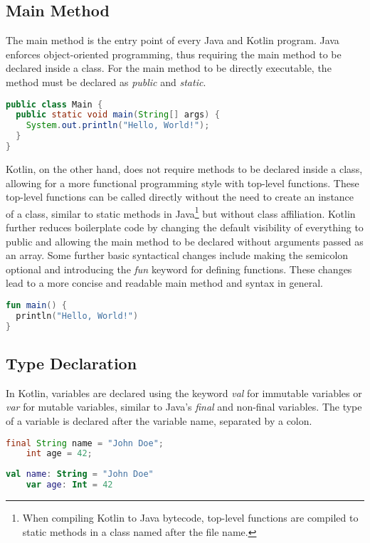 \documentclass[a4paper, 11pt]{article}
\begin{document}
\subsection{Main Method}
  The main method is the entry point of every Java and Kotlin program.
  Java enforces object-oriented programming, thus requiring the main method to be declared inside a class.
  For the main method to be directly executable, the method must be declared as \textit{public} and \textit{static}.
  \begin{lstlisting}[language=Java,title={Java main method}]
public class Main {
  public static void main(String[] args) {
    System.out.println("Hello, World!");
  }
}
\end{lstlisting}
  Kotlin, on the other hand, does not require methods to be declared inside a class, allowing for a more functional programming style with top-level functions.\cite{kotlin-functions-scope}
  These top-level functions can be called directly without the need to create an instance of a class, similar to static methods in Java\footnote{When compiling Kotlin to Java bytecode, top-level functions are compiled to static methods in a class named after the file name.} but without class affiliation.
  Kotlin further reduces boilerplate code by changing the default visibility of everything to public and allowing the main method to be declared without arguments passed as an array.\cite{visibility-modifiers,program-entry-point}
  Some further basic syntactical changes include making the semicolon optional and introducing the \textit{fun} keyword for defining functions.
  These changes lead to a more concise and readable main method and syntax in general.

\begin{lstlisting}[language=Kotlin,title={Kotlin main method}]
fun main() {
  println("Hello, World!")
}
\end{lstlisting}

\subsection{Type Declaration}
  In Kotlin, variables are declared using the keyword \textit{val} for immutable variables or \textit{var} for mutable variables, similar to Java's \textit{final} and non-final variables.
  The type of a variable is declared after the variable name, separated by a colon.
\begin{lstlisting}[language=Java,title={Java data types}]
    final String name = "John Doe";
    int age = 42;
  \end{lstlisting}
  \begin{lstlisting}[language=Kotlin,title={Kotlin data types}]
    val name: String = "John Doe"
    var age: Int = 42
  \end{lstlisting}
\end{document}
